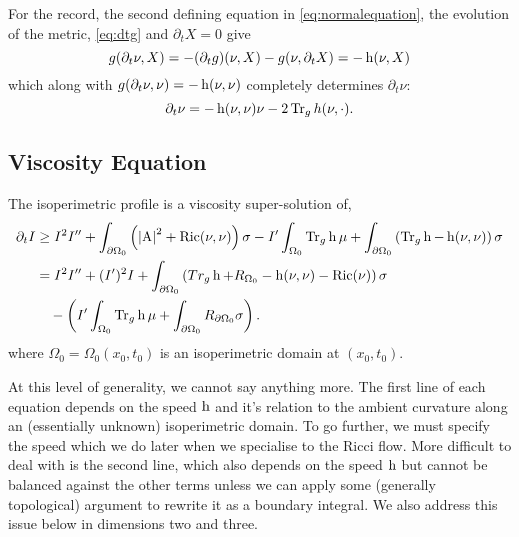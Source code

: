 \documentclass{amsart}
\begin{document}
\begin{rem}
For the record, the second defining equation in \eqref{eq:normalequation}, the evolution of the metric, \eqref{eq:dtg} and \(\partial_t X = 0\) give
\[
g(\partial_t \nu, X) = -(\partial_t g) (\nu, X) - g(\nu, \partial_t X) = -\operatorname{h}(\nu, X)
\]
which along with \(g(\partial_t \nu, \nu) = - \operatorname{h}(\nu, \nu)\) completely determines \(\partial_t \nu\):
\[
\partial_t \nu = -\operatorname{h}(\nu, \nu) \nu - 2\operatorname{Tr}_g h(\nu, \cdot).
\]
\end{rem}

\subsection{Viscosity Equation}
\label{subsec:iso_diff_ineq_viscosity}

\begin{thm}
\label{thm:general_viscosity}
The isoperimetric profile is a viscosity super-solution of,
\[
\begin{split}
\partial_t I &\geq I^2 I'' +  \int_{\partial {\Omega_0}} \left(\left|{\operatorname{A}}\right|^2 + \operatorname{Ric}(\nu, \nu)\right) \sigma  - I'\int_{\Omega_0} \operatorname{Tr}_g \operatorname{h} \mu + \int_{\partial {\Omega_0}} \left(\operatorname{Tr}_g \operatorname{h} - \operatorname{h}(\nu, \nu)\right) \sigma \\
&= I^2 I'' +  (I')^2 I + \int_{\partial {\Omega_0}} \left(Tr_g \operatorname{h} + R_{\Omega_0} - \operatorname{h}(\nu, \nu) - \operatorname{Ric}(\nu)\right) \sigma \\
&\quad - \left(I'\int_{\Omega_0} \operatorname{Tr}_g \operatorname{h} \mu + \int_{\partial {\Omega_0}} R_{\partial {\Omega_0}}\sigma \right) .
\end{split}
\]
where \(\Omega_0 = \Omega_0(x_0, t_0)\) is an isoperimetric domain at \((x_0, t_0)\).
\end{thm}

\begin{rem}
At this level of generality, we cannot say anything more. The first line of each equation depends on the speed \(\operatorname{h}\) and it's relation to the ambient curvature along an (essentially unknown) isoperimetric domain. To go further, we must specify the speed which we do later when we specialise to the Ricci flow. More difficult to deal with is the second line, which also depends on the speed \(\operatorname{h}\) but cannot be balanced against the other terms unless we can apply some (generally topological) argument to rewrite it as a boundary integral. We also address this issue below in dimensions two and three.
\end{rem}
\end{document}
